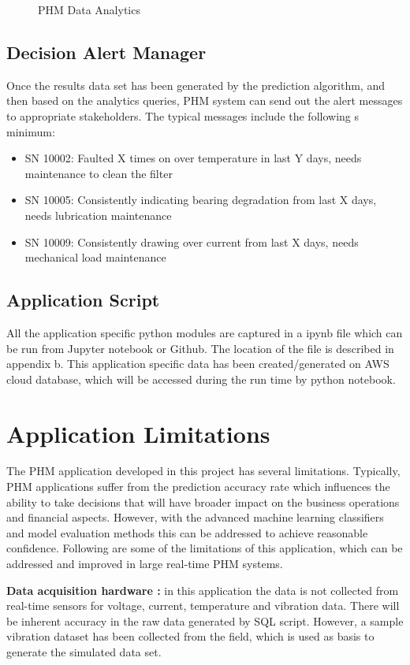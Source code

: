 \documentclass[sigconf]{acmart}
\begin{document}
\begin{figure}
\caption{PHM Data Analytics} \label{fig:Figure4}
\end{figure}

\subsection{Decision Alert Manager}
Once the results data set has been generated by the prediction algorithm, and then based on the analytics queries, PHM system can send out the alert messages to appropriate stakeholders. The typical messages include the following s minimum:
\begin{itemize}
  \item SN 10002: Faulted X times on over temperature in last Y days, needs maintenance to clean the filter
  \item SN 10005: Consistently indicating bearing degradation from last X days, needs lubrication maintenance
\item SN 10009: Consistently drawing over current from last X days, needs mechanical load maintenance
\end{itemize}

\subsection{Application Script}
All the application specific python modules are captured in a ipynb file which can be run from Jupyter notebook or Github. The location of the file is described in appendix b. This application specific data has been created/generated on AWS cloud database, which will be accessed during the run time by python notebook.
\section{Application Limitations}
The PHM application developed in this project has several limitations. Typically, PHM applications suffer from the prediction accuracy rate which influences the ability to take decisions that will have broader impact on the business operations and financial aspects. However, with the advanced machine learning classifiers and model evaluation methods this can be addressed to achieve reasonable confidence. Following are some of the limitations of this application, which can be addressed and improved in large real-time PHM systems.

\textbf{Data acquisition hardware :} in this application the data is not collected from real-time sensors for voltage, current, temperature and vibration data. There will be inherent accuracy in the raw data generated by SQL script. However, a sample vibration dataset has been collected from the field, which is used as basis to generate the simulated data set.
\end{document}

